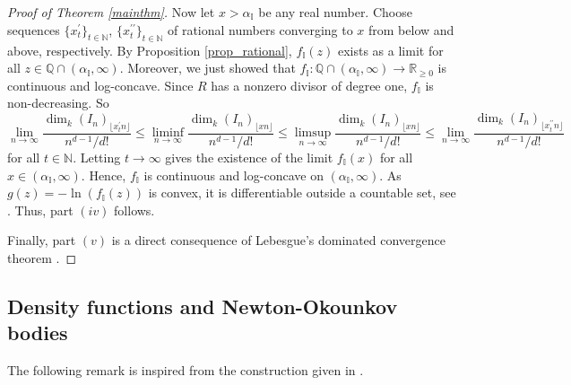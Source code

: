 \documentclass[12pt,a4paper]{amsart}
\theoremstyle{plain}
\theoremstyle{definition}
\numberwithin{equation}{theorem}
\begin{document}
\begin{proof}[Proof of Theorem \ref{mainthm}]
Now let $x>\alpha_{\mathbb{I}}$ be any real number. Choose sequences ${\{x^{\prime}_t\}}_{t\in\mathbb{N}}$, ${\{x^{\prime\prime}_t\}}_{t\in\mathbb{N}}$ of rational numbers converging to $x$ from below and above, respectively. By Proposition \ref{prop_rational}, $f_{\mathbb{I}}(z)$ exists as a limit for all $z\in \mathbb{Q}\cap (\alpha_{\mathbb{I}},\infty)$. Moreover, we just showed that $f_{\mathbb{I}} \colon \mathbb{Q}\cap (\alpha_{\mathbb{I}},\infty) \to \mathbb{R}_{\geq 0}$ is continuous and log-concave. Since $R$ has a nonzero divisor of degree one, $f_{\mathbb{I}}$ is non-decreasing. So $$\lim_{n\to\infty}\dfrac{\dim_k {\left(I_n\right)}_{\lfloor x^{\prime}_t n \rfloor}}{n^{d-1}/d!} \leq \liminf_{n\to\infty}\dfrac{\dim_k {\left(I_n\right)}_{\lfloor xn \rfloor}}{n^{d-1}/d!} \leq \limsup_{n\to\infty}\dfrac{\dim_k {\left(I_n\right)}_{\lfloor xn \rfloor}}{n^{d-1}/d!} \leq \lim_{n\to\infty}\dfrac{\dim_k {\left(I_n\right)}_{\lfloor x^{\prime\prime}_t n \rfloor}}{n^{d-1}/d!}$$ for all $t\in \mathbb{N}$. Letting $t\to\infty$ gives the existence of the limit $f_{\mathbb{I}}(x)$ for all $x\in (\alpha_{\mathbb{I}},\infty)$. Hence, $f_{\mathbb{I}}$ is continuous and log-concave on $(\alpha_{\mathbb{I}},\infty)$. As $g(z) = -\ln\left(f_{\mathbb{I}}(z)\right)$ is convex, it is differentiable outside a countable set, see \cite[Theorem 1.4]{Gru07}. Thus, part $(iv)$ follows.

Finally, part $(v)$ is a direct consequence of Lebesgue's dominated convergence theorem \cite[Theorem 11.32]{Rud76}.
\end{proof}

\subsection{Density functions and Newton-Okounkov bodies}
The following remark is inspired from the construction given in \cite[Remark 4.14]{LM09}.
\end{document}

